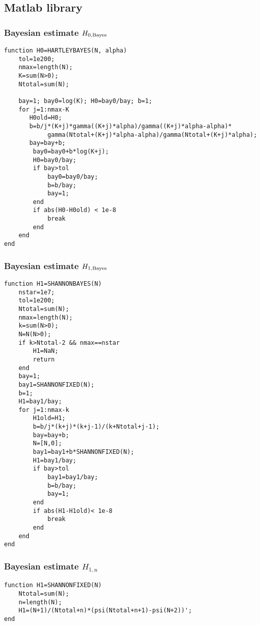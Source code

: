 \subsection{Matlab library}

\subsubsection{Bayesian estimate $ H_{0,\mbox{\scriptsize{Bayes}}}$ }
\ttfamily
\begin{lstlisting}
function H0=HARTLEYBAYES(N, alpha)
    tol=1e200; 
    nmax=length(N);
    K=sum(N>0);
    Ntotal=sum(N);

    bay=1; bay0=log(K); H0=bay0/bay; b=1;
    for j=1:nmax-K
       H0old=H0;
       b=b/j*(K+j)*gamma((K+j)*alpha)/gamma((K+j)*alpha-alpha)*
       		gamma(Ntotal+(K+j)*alpha-alpha)/gamma(Ntotal+(K+j)*alpha);
       bay=bay+b;
        bay0=bay0+b*log(K+j);
        H0=bay0/bay;
        if bay>tol
            bay0=bay0/bay;
            b=b/bay;
            bay=1;
        end
        if abs(H0-H0old) < 1e-8
            break
        end
    end
end
\end{lstlisting}

\normalfont
\subsubsection{Bayesian estimate $ H_{1,\mbox{\scriptsize{Bayes}}}$ }
\ttfamily
\begin{lstlisting}
function H1=SHANNONBAYES(N)
    nstar=1e7;
    tol=1e200; 
    Ntotal=sum(N);
    nmax=length(N);
    k=sum(N>0);
    N=N(N>0);
    if k>Ntotal-2 && nmax==nstar
        H1=NaN;
        return
    end
    bay=1;
    bay1=SHANNONFIXED(N);
    b=1;
    H1=bay1/bay;
    for j=1:nmax-k
        H1old=H1;
        b=b/j*(k+j)*(k+j-1)/(k+Ntotal+j-1);
        bay=bay+b;
        N=[N,0];
        bay1=bay1+b*SHANNONFIXED(N);
        H1=bay1/bay;
        if bay>tol
            bay1=bay1/bay;
            b=b/bay;
            bay=1;
        end
        if abs(H1-H1old)< 1e-8
            break
        end
    end
end
\end{lstlisting}

\normalfont
\subsubsection{Bayesian estimate $ H_{1,\text{n}}$ }
\ttfamily
\begin{lstlisting}
function H1=SHANNONFIXED(N)
	Ntotal=sum(N);
	n=length(N);
	H1=(N+1)/(Ntotal+n)*(psi(Ntotal+n+1)-psi(N+2))';
end
\end{lstlisting}

\normalfont
\ttfamily
\begin{lstlisting}

\end{lstlisting}


